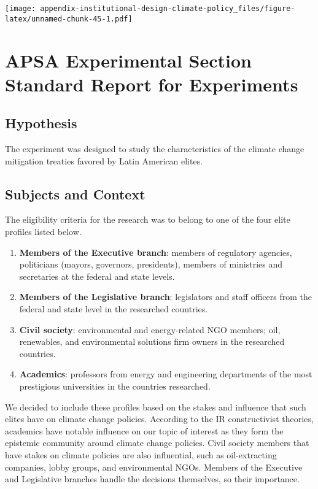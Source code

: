 \documentclass[12pt,a4paper,]{article}
\providecommand{\tightlist}{%
   \setlength{\itemsep}{0pt}\setlength{\parskip}{0pt}}
\begin{document}
\texttt{[image: appendix-institutional-design-climate-policy\_files/figure-latex/unnamed-chunk-45-1.pdf]}

\newpage

\hypertarget{apsa-experimental-section-standard-report-for-experiments}{%
\section{APSA Experimental Section Standard Report for
Experiments}\label{apsa-experimental-section-standard-report-for-experiments}}

\hypertarget{hypothesis}{%
\subsection{Hypothesis}\label{hypothesis}}

The experiment was designed to study the characteristics of the climate
change mitigation treaties favored by Latin American elites.

\hypertarget{subjects-and-context}{%
\subsection{Subjects and Context}\label{subjects-and-context}}

The eligibility criteria for the research was to belong to one of the
four elite profiles listed below.

\begin{enumerate}
\def\labelenumi{\arabic{enumi}.}
\tightlist
\item
  \textbf{Members of the Executive branch}: members of regulatory
  agencies, politicians (mayors, governors, presidents), members of
  ministries and secretaries at the federal and state levels.
\item
  \textbf{Members of the Legislative branch}: legislators and staff
  officers from the federal and state level in the researched countries.
\item
  \textbf{Civil society}: environmental and energy-related NGO members;
  oil, renewables, and environmental solutions firm owners in the
  researched countries.
\item
  \textbf{Academics}: professors from energy and engineering departments
  of the most prestigious universities in the countries researched.
\end{enumerate}

We decided to include these profiles based on the stakes and influence
that such elites have on climate change policies. According to the IR
constructivist theories, academics have notable influence on our topic
of interest as they form the epistemic community around climate change
policies. Civil society members that have stakes on climate policies are
also influential, such as oil-extracting companies, lobby groups, and
environmental NGOs. Members of the Executive and Legislative branches
handle the decisions themselves, so their importance.
\end{document}
